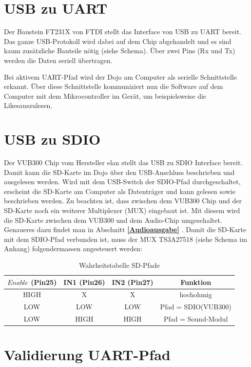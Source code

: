 \section{USB zu UART}

Der Baustein FT231X von FTDI stellt das Interface von USB zu UART bereit. Das ganze USB-Protokoll wird dabei auf dem Chip abgehandelt und es sind kaum zusätzliche Bauteile nötig (siehe Schema). Über zwei Pins (Rx und Tx) werden die Daten seriell übertragen.

Bei aktivem UART-Pfad wird der Dojo am Computer als serielle Schnittstelle erkannt. Über diese Schnittstelle kommuniziert nun die Software auf dem Computer mit dem Mikrocontroller im Gerät, um beispielsweise die \flq Likes\frq  auszulesen.


\section{USB zu SDIO}

Der VUB300 Chip vom Hersteller elan stellt das USB zu SDIO Interface bereit. Damit kann die SD-Karte im Dojo über den USB-Anschluss beschrieben und ausgelesen werden. Wird mit dem USB-Switch der SDIO-Pfad durchgeschaltet, erscheint die SD-Karte am Computer als Datenträger und kann gelesen sowie beschrieben werden. Zu beachten ist, dass zwischen dem VUB300 Chip und der SD-Karte noch ein weiterer Multiplexer (MUX) eingebaut ist. Mit diesem wird die SD-Karte zwischen dem VUB300 und dem Audio-Chip umgeschaltet. Genaueres dazu findet man in Abschnitt \textbf{\ref{Audioausgabe} }.
Damit die SD-Karte mit dem SDIO-Pfad verbunden ist, muss der MUX TS3A27518 (siehe Schema im Anhang) folgendermassen angesteuert werden:

\begin{table}[h]
	\centering
	\begin{tabular}{|c|c|c|c|} 
		$\overline{Enable}$ (Pin25) & IN1 (Pin26) & IN2 (Pin27) & Funktion \\ 
		\hline 
		HIGH & X & X & hochohmig \\ 
		\hline 
		LOW & LOW & LOW & Pfad = SDIO(VUB300) \\ 
		\hline 
		LOW & HIGH & HIGH & Pfad = Sound-Modul \\ 
	\end{tabular} 
	\caption{Wahrheitstabelle SD-Pfade}
	\label{truth_table_sd}
\end{table}

\section{Validierung UART-Pfad}

